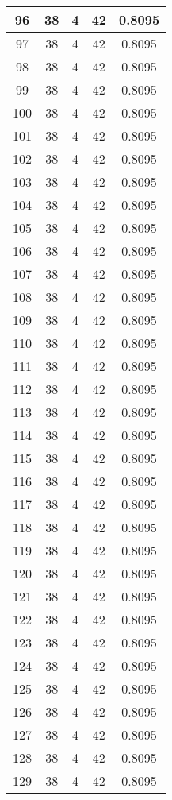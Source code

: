 \documentclass[letterpaper, 12pt]{article}
\begin{document}
\begin{longtable}{|c|c|c|c|c|}
\hline
96 & 38 & 4 & 42 & 0.8095 \\
\hline
97 & 38 & 4 & 42 & 0.8095 \\
\hline
98 & 38 & 4 & 42 & 0.8095 \\
\hline
99 & 38 & 4 & 42 & 0.8095 \\
\hline
100 & 38 & 4 & 42 & 0.8095 \\
\hline
101 & 38 & 4 & 42 & 0.8095 \\
\hline
102 & 38 & 4 & 42 & 0.8095 \\
\hline
103 & 38 & 4 & 42 & 0.8095 \\
\hline
104 & 38 & 4 & 42 & 0.8095 \\
\hline
105 & 38 & 4 & 42 & 0.8095 \\
\hline
106 & 38 & 4 & 42 & 0.8095 \\
\hline
107 & 38 & 4 & 42 & 0.8095 \\
\hline
108 & 38 & 4 & 42 & 0.8095 \\
\hline
109 & 38 & 4 & 42 & 0.8095 \\
\hline
110 & 38 & 4 & 42 & 0.8095 \\
\hline
111 & 38 & 4 & 42 & 0.8095 \\
\hline
112 & 38 & 4 & 42 & 0.8095 \\
\hline
113 & 38 & 4 & 42 & 0.8095 \\
\hline
114 & 38 & 4 & 42 & 0.8095 \\
\hline
115 & 38 & 4 & 42 & 0.8095 \\
\hline
116 & 38 & 4 & 42 & 0.8095 \\
\hline
117 & 38 & 4 & 42 & 0.8095 \\
\hline
118 & 38 & 4 & 42 & 0.8095 \\
\hline
119 & 38 & 4 & 42 & 0.8095 \\
\hline
120 & 38 & 4 & 42 & 0.8095 \\
\hline
121 & 38 & 4 & 42 & 0.8095 \\
\hline
122 & 38 & 4 & 42 & 0.8095 \\
\hline
123 & 38 & 4 & 42 & 0.8095 \\
\hline
124 & 38 & 4 & 42 & 0.8095 \\
\hline
125 & 38 & 4 & 42 & 0.8095 \\
\hline
126 & 38 & 4 & 42 & 0.8095 \\
\hline
127 & 38 & 4 & 42 & 0.8095 \\
\hline
128 & 38 & 4 & 42 & 0.8095 \\
\hline
129 & 38 & 4 & 42 & 0.8095 \\

\end{longtable}
\end{document}
